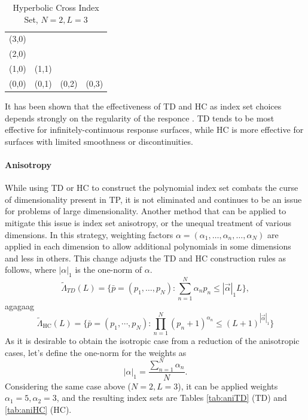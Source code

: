 \begin{table}[h]
  \centering
  \begin{tabular}{c c c c}
    (3,0) &       &       &       \\
    (2,0) &       &       &       \\
    (1,0) & (1,1) &       &       \\
    (0,0) & (0,1) & (0,2) & (0,3)
  \end{tabular}
  \caption{Hyperbolic Cross Index Set, $N=2,L=3$}
  \label{tab:HC}
\end{table}

It has been shown that the effectiveness of TD and HC as index set choices depends strongly on the regularity
of the responce \cite{hctd}.  TD tends to be most effective for infinitely-continuous response surfaces,
while HC is more effective for surfaces with limited smoothness or discontinuities.

\paragraph{Anisotropy}
While using TD or HC to construct the polynomial index set combats the curse of dimensionality present in TP,
it is not eliminated and continues to be an issue for problems of large dimensionality.  Another method that can
be applied to mitigate this issue is index set anisotropy, or the unequal treatment of various dimensions.
In this strategy, weighting factors $\alpha=(\alpha_1,\ldots,\alpha_n,\ldots,\alpha_N)$ are applied in each
dimension to allow additional polynomials in some dimensions and less in others.  This change adjusts the TD
and HC construction rules as follows, where $|\alpha|_1$ is the one-norm of $\alpha$.
\begin{equation}
  \tilde\Lambda_{TD}(L)=\Big\{\bar p=(p_1,\ldots,p_N):\sum_{n=1}^{N} \alpha_n p_{n} \leq |\vec\alpha|_1 L\Big\},
\end{equation}
agagaag
\begin{equation}
  \tilde\Lambda_\text{HC}(L)=\Big\{\bar p=(p_1,\cdots,p_N):\prod_{n=1}^N (p_n+1)^{\alpha_n} \leq
  (L+1)^{|\vec\alpha|_1} \Big\}
\end{equation}
As it is desirable to obtain the isotropic case from a reduction of the anisotropic cases, let's define the
one-norm for the weights as
\begin{equation}
  |\alpha|_1 = \frac{\sum_{n=1}^N \alpha_n}{N}.
\end{equation}
Considering the same case above ($N=2,L=3$), it can be applied weights $\alpha_1=5,\alpha_2=3$, and the resulting index
sets are Tables \ref{tab:aniTD} (TD) and \ref{tab:aniHC} (HC).

